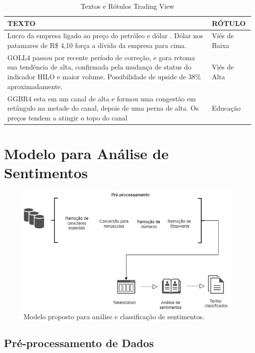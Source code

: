 \documentclass[conference]{IEEEtran}
\begin{document}
\begin{table}
\caption{Textos e Rótulos Trading View} \label{tab:long} 
\centering
\begin{tabular}{>{\centering\arraybackslash}m{5.5cm}|>{\centering\arraybackslash}m{2cm}}
\hline
\hline
TEXTO & RÓTULO \\ \hline
Lucro da empresa ligado ao preço do petróleo e dólar . Dólar nos patamares de R\$ 4,10 força a dívida da empresa para cima. & Viés de Baixa \\ \hline
GOLL4 passou por recente período de correção, e gora retoma sua tendência de alta, confirmada pela mudança de status do indicador HILO e maior volume. Possibilidade de upside de 38\% aproximadamente. & Viés de Alta  \\ \hline
GGBR4 esta em um canal de alta e formou uma congestão em retângulo na metade do canal, depois de uma perna de alta.  Os preços tendem a atingir o topo do canal & Educação \\ \hline
\end{tabular}
\end{table}


\section{Modelo para Análise de Sentimentos}

\begin{figure}[h]
\begin{center}
\includegraphics[width=0.6\linewidth]{DiagramaSentimenal.png}
\end{center}
   \caption{Modelo proposto para análise e classificação de sentimentos.}
\label{fig:bubble}
\end{figure}

\subsection{Pré-processamento de Dados}
\end{document}
